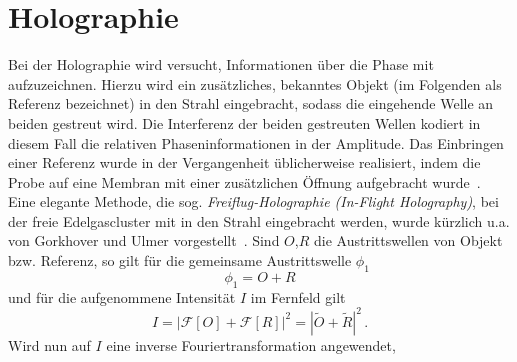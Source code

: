 \section{Holographie}
Bei der Holographie wird versucht, Informationen über die Phase mit aufzuzeichnen. Hierzu wird ein zusätzliches, bekanntes Objekt (im Folgenden als Referenz bezeichnet) in den Strahl eingebracht, sodass die eingehende Welle an beiden gestreut wird. Die Interferenz der beiden gestreuten Wellen kodiert in diesem Fall die relativen Phaseninformationen in der Amplitude.
Das Einbringen einer Referenz wurde in der Vergangenheit üblicherweise realisiert, indem die Probe auf eine Membran mit einer zusätzlichen Öffnung aufgebracht wurde~\cite{eisebitt2004}. Eine elegante Methode, die sog. \textit{Freiflug-Holographie (In-Flight Holography)}, bei der freie Edelgascluster mit in den Strahl eingebracht werden, wurde kürzlich u.a. von Gorkhover und Ulmer vorgestellt~\cite{gorkhover2016,ulmer2015}. 
Sind $O$,$R$ die Austrittswellen von Objekt bzw. Referenz, so gilt für die gemeinsame Austrittswelle $\phi_1$
\begin{equation}
	\phi_1=O+R 
\end{equation}
und für die aufgenommene Intensität $I$ im Fernfeld gilt
\begin{equation}
	I=\left|\mathscr{F}\left[O\right]+\mathscr{F}\left[R\right]\right|^2=\left|\tilde{O}+\tilde{R}\right|^2\,.
\end{equation}
Wird nun auf $I$ eine inverse Fouriertransformation angewendet,

